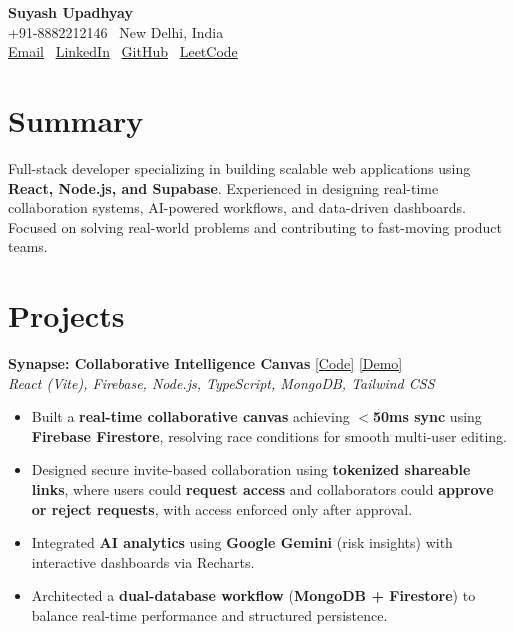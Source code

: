 \documentclass[10pt, a4paper]{article}
\begin{document}
\begin{center}
{\Huge \textbf{Suyash Upadhyay}}\\
+91-8882212146 \textbar\ New Delhi, India \\
\href{mailto:suyash.upadhyay01@gmail.com}{Email} \textbar\
\href{https://www.linkedin.com/in/suyash-upadhyay-49554b333/}{LinkedIn} \textbar\
\href{https://github.com/kryonic-fluke}{GitHub} \textbar\
\href{https://leetcode.com/u/pssv_aggrsv_coder/}{LeetCode}
\end{center}

\section*{Summary}
Full-stack developer specializing in building scalable web applications using \textbf{React, Node.js, and Supabase}. Experienced in designing real-time collaboration systems, AI-powered workflows, and data-driven dashboards. Focused on solving real-world problems and contributing to fast-moving product teams.

\section*{Projects}

\textbf{Synapse: Collaborative Intelligence Canvas} \hfill \href{https://github.com/kryonic-fluke/Synapse}{[Code]} \href{https://synapse-workspace.netlify.app/}{[Demo]} \\
\textit{React (Vite), Firebase, Node.js, TypeScript, MongoDB, Tailwind CSS}
\begin{itemize}[leftmargin=*, itemsep=2pt, topsep=2pt]
\item Built a \textbf{real-time collaborative canvas} achieving \textbf{$<$50ms sync} using \textbf{Firebase Firestore}, resolving race conditions for smooth multi-user editing.
\item Designed secure invite-based collaboration using \textbf{tokenized shareable links}, where users could \textbf{request access} and collaborators could \textbf{approve or reject requests}, with access enforced only after approval.
\item Integrated \textbf{AI analytics} using \textbf{Google Gemini} (risk insights) with interactive dashboards via Recharts.
\item Architected a \textbf{dual-database workflow} (\textbf{MongoDB + Firestore}) to balance real-time performance and structured persistence.
\end{itemize}
\end{document}
